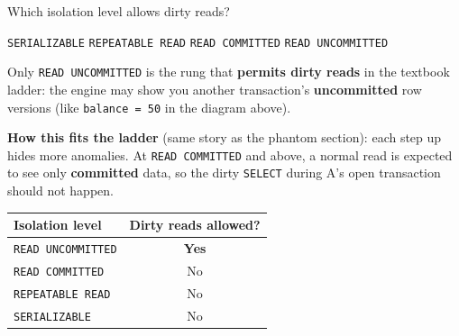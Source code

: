 \question[4]
Which isolation level allows dirty reads?
\begin{choices}
  \choice \texttt{SERIALIZABLE}
  \choice \texttt{REPEATABLE READ}
  \choice \texttt{READ COMMITTED}
  \CorrectChoice \texttt{READ UNCOMMITTED}
\end{choices}
\begin{solution}
  Only \texttt{READ UNCOMMITTED} is the rung that \textbf{permits dirty reads} in the textbook ladder: the engine may show you another transaction's \textbf{uncommitted} row versions (like \texttt{balance = 50} in the diagram above).

  \medskip
  \noindent\textbf{How this fits the ladder} (same story as the phantom section): each step up hides more anomalies. At \texttt{READ COMMITTED} and above, a normal read is expected to see only \textbf{committed} data, so the dirty \texttt{SELECT} during A's open transaction should not happen.

  \begin{center}
  \footnotesize
  \renewcommand{\arraystretch}{1.15}
  \begin{tabular}{|l|c|}
    \hline
    \textbf{Isolation level} & \textbf{Dirty reads allowed?} \\
    \hline
    \texttt{READ UNCOMMITTED}  & \textbf{Yes} \\
    \texttt{READ COMMITTED}    & No \\
    \texttt{REPEATABLE READ}   & No \\
    \texttt{SERIALIZABLE}      & No \\
    \hline
  \end{tabular}
  \renewcommand{\arraystretch}{1}
  \end{center}
\end{solution}

